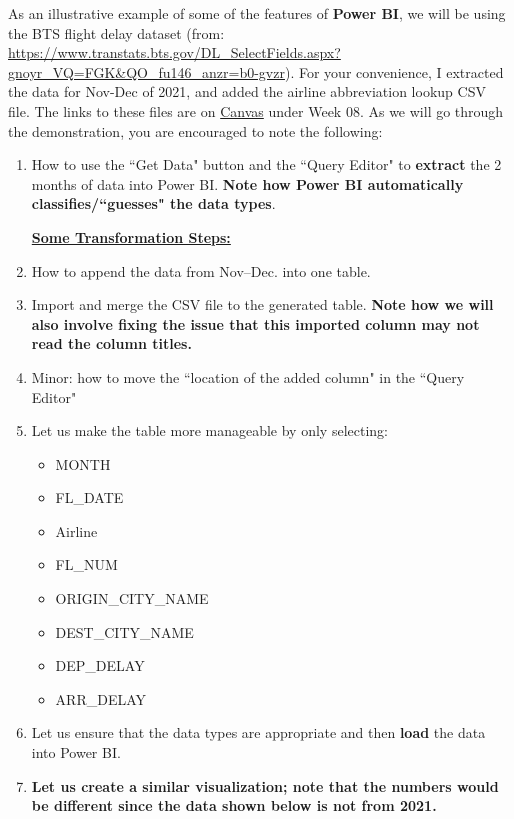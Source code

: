 \documentclass[letterpaper,addpoints, 11pt]{exam}
\begin{document}
\begin{questions}

\question[0] As an illustrative example of some of the features of \textbf{Power BI}, we will be using the BTS flight delay dataset (from: \url{https://www.transtats.bts.gov/DL_SelectFields.aspx?gnoyr_VQ=FGK&QO_fu146_anzr=b0-gvzr}). For your convenience, I extracted the data for Nov-Dec of 2021, and  added the airline abbreviation lookup CSV file. The links to these files are on \underline{Canvas} under Week 08. As we will go through the demonstration, you are encouraged to note the following: 
\begin{enumerate}[label=(\Alph*)]
	\item How to use the ``Get Data" button and the ``Query Editor" to \textbf{extract} the 2 months of data into Power BI. \textbf{Note how Power BI automatically classifies/``guesses" the data types}.\\
	\bigskip \bigskip \bigskip \bigskip
	
	\noindent \underline{\textbf{Some Transformation Steps:}}
	\item How to append the data from Nov--Dec. into one table.
	\bigskip \bigskip \bigskip  
	\item Import and merge the CSV file to the generated table. \textbf{Note how we will also involve fixing the issue that this imported column may not read the column titles.}
	\bigskip \bigskip
	\item Minor: how to move the ``location of the added column" in the ``Query Editor"
	\bigskip
	\item Let us make the table more manageable by only selecting: 
	\begin{itemize}[nosep]
		\item MONTH
		\item FL\_DATE
		\item Airline
		\item FL\_NUM
		\item ORIGIN\_CITY\_NAME
		\item DEST\_CITY\_NAME
		\item DEP\_DELAY 
		\item ARR\_DELAY
	\end{itemize}
	\item Let us ensure that the data types are appropriate and then \textbf{load} the data into Power BI.
	\bigskip \bigskip
	\item \textbf{Let us create a similar visualization; note that the numbers would be different since the data shown below is not from 2021.}	
\end{enumerate}
 	

\end{questions}
\end{document}
